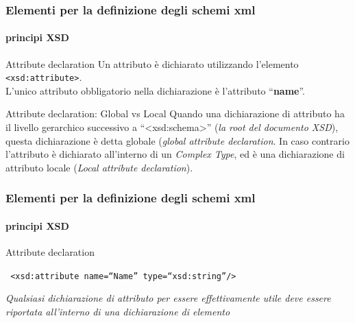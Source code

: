 


\begin{frame}
	\frametitle{Elementi per la definizione degli schemi xml}
	\framesubtitle{principi XSD}
	\addtocounter{nframe}{1}

	\begin{block}{Attribute declaration}
		Un attributo è dichiarato utilizzando l'elemento \texttt{<xsd:attribute>}. \\ L'unico attributo obbligatorio nella dichiarazione è l'attributo ``\textbf{name}''.
	\end{block}

	\begin{block}{Attribute declaration: Global vs Local}
		Quando una dichiarazione di attributo ha il livello gerarchico successivo a ``<xsd:schema>'' (\textit{la root del documento XSD}), questa dichiarazione è detta globale (\textit{global attribute declaration}. In caso contrario l'attributo è dichiarato all'interno di un \textit{Complex Type}, ed è una dichiarazione di attributo locale (\textit{Local attribute declaration}).
	\end{block}

\end{frame}

\begin{frame}
	\frametitle{Elementi per la definizione degli schemi xml}
	\framesubtitle{principi XSD}
	\addtocounter{nframe}{1}
	\begin{block}{Attribute declaration}

		\texttt{
			<xsd:attribute name=``Name'' type=``xsd:string''/>
		}

	\end{block}
	\textit{Qualsiasi dichiarazione di attributo per essere effettivamente utile deve essere riportata all'interno di una dichiarazione di elemento}
\end{frame}


